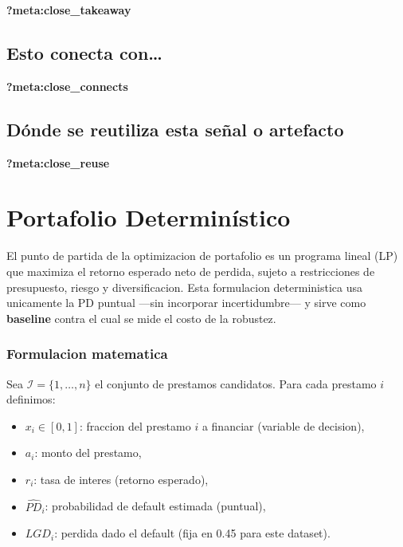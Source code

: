 \documentclass[
  spanish,
  11pt,
  letterpaper,
]{scrbook}
\providecommand{\tightlist}{%
  \setlength{\itemsep}{0pt}\setlength{\parskip}{0pt}}
\theoremstyle{plain}
\theoremstyle{remark}
\begin{document}
\begin{tcolorbox}[enhanced jigsaw, arc=.35mm, bottomrule=.15mm, bottomtitle=1mm, breakable, colback=white, colbacktitle=quarto-callout-tip-color!10!white, colframe=quarto-callout-tip-color-frame, coltitle=black, left=2mm, leftrule=.75mm, opacityback=0, opacitybacktitle=0.6, rightrule=.15mm, title=\textcolor{quarto-callout-tip-color}{\faLightbulb}\hspace{0.5em}{Qué debes quedarte}, titlerule=0mm, toprule=.15mm, toptitle=1mm]

\textbf{?meta:close\_takeaway}

\section{Esto conecta con\ldots{}}\label{esto-conecta-con-7}

\textbf{?meta:close\_connects}

\section{Dónde se reutiliza esta señal o
artefacto}\label{duxf3nde-se-reutiliza-esta-seuxf1al-o-artefacto-7}

\textbf{?meta:close\_reuse}

\end{tcolorbox}

\chapter{Portafolio Determinístico}\label{sec-deterministic-portfolio}

El punto de partida de la optimizacion de portafolio es un programa
lineal (LP) que maximiza el retorno esperado neto de perdida, sujeto a
restricciones de presupuesto, riesgo y diversificacion. Esta formulacion
deterministica usa unicamente la PD puntual ---sin incorporar
incertidumbre--- y sirve como \textbf{baseline} contra el cual se mide
el costo de la robustez.

\subsection{Formulacion matematica}\label{formulacion-matematica}

Sea \(\mathcal{I} = \{1, \dots, n\}\) el conjunto de prestamos
candidatos. Para cada prestamo \(i\) definimos:

\begin{itemize}
\tightlist
\item
  \(x_i \in [0, 1]\): fraccion del prestamo \(i\) a financiar (variable
  de decision),
\item
  \(a_i\): monto del prestamo,
\item
  \(r_i\): tasa de interes (retorno esperado),
\item
  \(\widehat{PD}_i\): probabilidad de default estimada (puntual),
\item
  \(LGD_i\): perdida dado el default (fija en 0.45 para este dataset).
\end{itemize}
\end{document}
